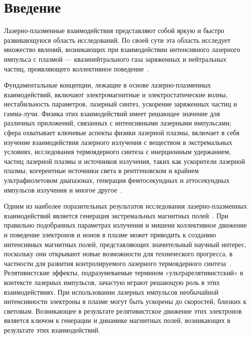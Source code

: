 \section{Введение}

Лазерно-плазменные взаимодействия представляют собой яркую и быстро развивающуюся область исследований. По своей сути эта область исследует множество явлений, возникающих при взаимодействии интенсивного лазерного импульса с плазмой --- квазинейтрального газа заряженных и нейтральных частиц, проявляющего коллективное поведение~\cite{chen1987introduction}.

Фундаментальные концепции, лежащие в основе лазерно-плазменных взаимодействий, включают электромагнитные и электростатические волны, нестабильность параметров, лазерный синтез, ускорение заряженных частиц и гамма-лучи. Физика этих взаимодействий имеет решающее значение для различных приложений, связанных с интенсивными лазерными импульсами; сфера охватывает ключевые аспекты физики лазерной плазмы, включает в себя изучение взаимодействия лазерного излучения с веществом в экстремальных условиях, исследования термоядерного синтеза с инерционным удержанием, частиц лазерной плазмы и источников излучения, таких как ускорители лазерной плазмы, когерентные источники света в рентгеновском и крайнем ультрафиолетовом диапазонах, генерация фемтосекундных и аттосекундных импульсов излучения и многое другое~\cite{gibbon1996lpi}.

Одним из наиболее поразительных результатов исследования лазерно-плазменных взаимодействий является генерация экстремальных магнитных полей~\cite{andreev2021generationmd}. При правильно подобранных параметрах излучения и мишени коллективное движение и поведение электронов и ионов в плазме может приводить к созданию интенсивных магнитных полей, представляющих значительный научный интерес, поскольку они открывают новые возможности для технического прогресса, в частности для развития контролируемого лазерного термоядерного синтеза~\cite{miyamoto_controlfusion}. Релятивистские эффекты, подразумеваемые термином «ультрарелятивистский» в контексте лазерных импульсов, зачастую играют решающую роль в этих взаимодействиях. При использовании лазерных импульсов необычайной интенсивности электроны в плазме могут быть ускорены до скоростей, близких к световым. Возникающее в результате релятивистское движение этих электронов является ключом к генерации и динамике магнитных полей, возникающих в результате этих взаимодействий. %

